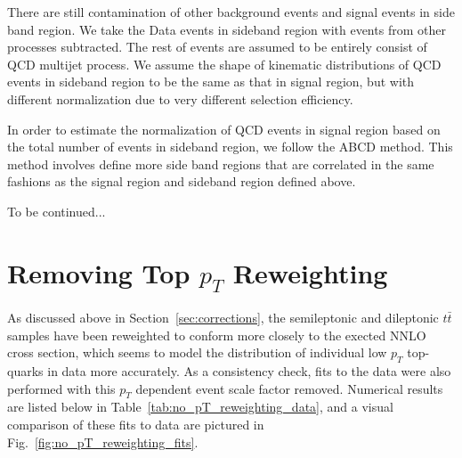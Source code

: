 \documentclass{cmspaperpdf}
\begin{document}
There are still contamination of other background events and signal events in side band region. We take the Data events in sideband region with events from other processes subtracted. The rest of events are assumed to be entirely consist of QCD multijet process. We assume the shape of kinematic distributions of QCD events in sideband region to be the same as that in signal region, but with different normalization due to very different selection efficiency. 

In order to estimate the normalization of QCD events in signal region based on the total number of events in sideband region, we follow the ABCD method. This method involves define more side band regions that are correlated in the same fashions as the signal region and sideband region defined above. 

To be continued...

\clearpage
\section{Removing Top $p_{T}$ Reweighting}

As discussed above in Section~\ref{sec:corrections}, the semileptonic and dileptonic $t\bar{t}$ samples have been reweighted to conform more closely to the exected NNLO cross section, which seems to model the distribution of individual low $p_{T}$ top-quarks in data more accurately. As a consistency check, fits to the data were also performed with this $p_{T}$ dependent event scale factor removed. Numerical results are listed below in Table~\ref{tab:no_pT_reweighting_data}, and a visual comparison of these fits to data are pictured in Fig.~\ref{fig:no_pT_reweighting_fits}.
\end{document}
